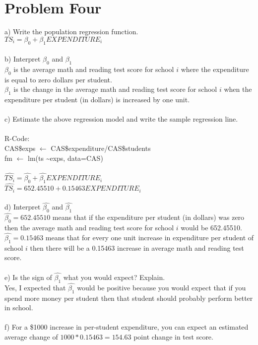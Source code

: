 \documentclass[11pt, oneside]{article}   	%
\begin{document}
\section{Problem Four}
a) Write the population regression function.\\
$TS_i = \beta_0 + \beta_1 EXPENDITURE_i$\\~\\
b) Interpret $\beta_0$ and $\beta_1$\\
$\beta_0$ is the average math and reading test score for school $i$ where the expenditure is equal to zero dollars per student.\\
$\beta_1$ is the change in the average math and reading test score for school $i$ when the expenditure per student (in dollars) is increased by one unit.\\~\\
c) Estimate the above regression model and write the sample regression line.\\~\\
R-Code:\\
CAS\$exps $\leftarrow$ CAS\$expenditure/CAS\$students \\
fm $\leftarrow$ lm(ts \textasciitilde exps, data=CAS)\\~\\
$\widehat{TS_i} = \hat{\beta_0} + \hat{\beta_1} EXPENDITURE_i$\\
$\widehat{TS_i} = 652.45510 + 0.15463 EXPENDITURE_i$\\~\\
d) Interpret $\hat{\beta_0}$ and $\hat{\beta_1}$ \\
$\hat{\beta_0} = 652.45510$ means that if the expenditure per student (in dollars) was zero then the average math and reading test score for school $i$ would be 652.45510.\\
$\hat{\beta_1} = 0.15463$ means that for every one unit increase in expenditure per student of school $i$ then there will be a 0.15463 increase in average math and reading test score.\\~\\
e) Is the sign of $\hat{\beta_1}$ what you would expect? Explain.\\
Yes, I expected that $\hat{\beta_1}$ would be positive because you would expect that if you spend more money per student then that student should probably perform better in school.\\~\\
f) For a \$1000 increase in per-student expenditure, you can expect an estimated average change of $1000 * 0.15463 = 154.63$ point change in test score.\\
\end{document}

